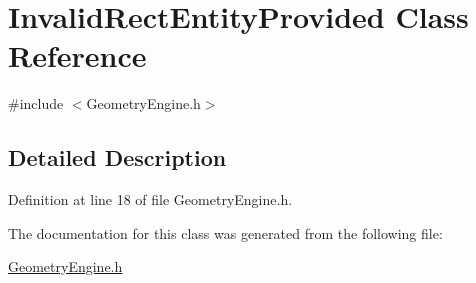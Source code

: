 \hypertarget{classInvalidRectEntityProvided}{\section{Invalid\-Rect\-Entity\-Provided Class Reference}
\label{classInvalidRectEntityProvided}
}


{\ttfamily \#include $<$Geometry\-Engine.\-h$>$}



\subsection{Detailed Description}


Definition at line 18 of file Geometry\-Engine.\-h.



The documentation for this class was generated from the following file\-:\begin{DoxyCompactItemize}
\item 
\hyperlink{GeometryEngine_8h}{Geometry\-Engine.\-h}\end{DoxyCompactItemize}

